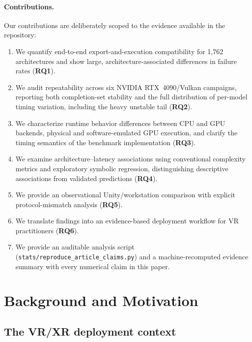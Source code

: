 \documentclass[10pt,twocolumn,letterpaper]{article}
\begin{document}
\paragraph{Contributions.}
Our contributions are deliberately scoped to the evidence available in the repository:
\begin{enumerate}[nosep,leftmargin=*]
  \item We quantify end-to-end export-and-execution compatibility for 1,762 architectures and show large, architecture-associated differences in failure rates (\textbf{RQ1}).
  \item We audit repeatability across six NVIDIA RTX~4090/Vulkan campaigns, reporting both completion-set stability and the full distribution of per-model timing variation, including the heavy unstable tail (\textbf{RQ2}).
  \item We characterize runtime behavior differences between CPU and GPU backends, physical and software-emulated GPU execution, and clarify the timing semantics of the benchmark implementation (\textbf{RQ3}).
  \item We examine architecture--latency associations using conventional complexity metrics and exploratory symbolic regression, distinguishing descriptive associations from validated predictions (\textbf{RQ4}).
  \item We provide an observational Unity/workstation comparison with explicit protocol-mismatch analysis (\textbf{RQ5}).
  \item We translate findings into an evidence-based deployment workflow for VR practitioners (\textbf{RQ6}).
  \item We provide an auditable analysis script (\texttt{stats/reproduce\_article\_claims.py}) and a machine-recomputed evidence summary with every numerical claim in this paper.
\end{enumerate}

\section{Background and Motivation}\label{sec:background}

\subsection{The VR/XR deployment context}
\end{document}
